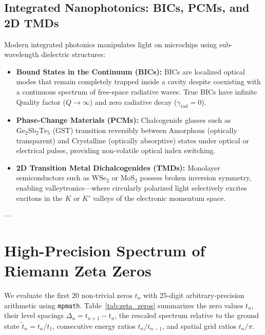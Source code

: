 \documentclass[11pt,a4paper]{article}
\begin{document}
\subsection{Integrated Nanophotonics: BICs, PCMs, and 2D TMDs}
Modern integrated photonics manipulates light on microchips using sub-wavelength dielectric structures:
\begin{itemize}
    \item \textbf{Bound States in the Continuum (BICs):} BICs are localized optical modes that remain completely trapped inside a cavity despite coexisting with a continuous spectrum of free-space radiative waves. True BICs have infinite Quality factor ($Q \to \infty$) and zero radiative decay ($\gamma_{\text{rad}} = 0$).
    \item \textbf{Phase-Change Materials (PCMs):} Chalcogenide glasses such as $\text{Ge}_2\text{Sb}_2\text{Te}_5$ (GST) transition reversibly between Amorphous (optically transparent) and Crystalline (optically absorptive) states under optical or electrical pulses, providing non-volatile optical index switching.
    \item \textbf{2D Transition Metal Dichalcogenides (TMDs):} Monolayer semiconductors such as $\text{WSe}_2$ or $\text{MoS}_2$ possess broken inversion symmetry, enabling valleytronics—where circularly polarized light selectively excites excitons in the $K$ or $K'$ valleys of the electronic momentum space.
\end{itemize}

---

\section{High-Precision Spectrum of Riemann Zeta Zeros}

We evaluate the first 20 non-trivial zeros $t_n$ with 25-digit arbitrary-precision arithmetic using \texttt{mpmath}. Table~\ref{tab:zeta_zeros} summarizes the zero values $t_n$, their level spacings $\Delta_n = t_{n+1} - t_n$, the rescaled spectrum relative to the ground state $\tilde{t}_n = t_n / t_1$, consecutive energy ratios $t_n / t_{n-1}$, and spatial grid ratios $t_n / \pi$.
\end{document}
